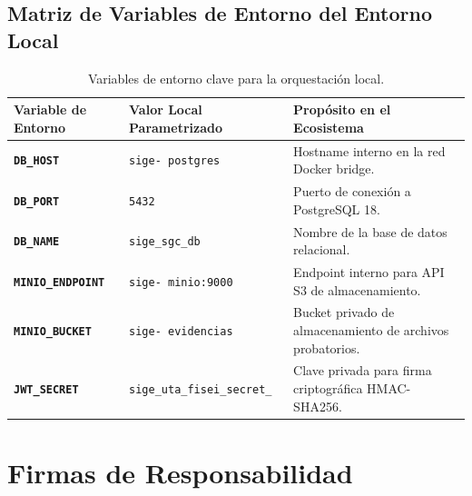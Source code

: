 \documentclass[12pt,a4paper]{article}
\begin{document}
\subsection{Matriz de Variables de Entorno del Entorno Local}
\begin{table}[H]
\centering
\small
\renewcommand{\arraystretch}{1.2}
\begin{tabularx}{\textwidth}{|>{\hsize=0.8\hsize\raggedright\arraybackslash\bfseries\footnotesize}X|>{\hsize=1.0\hsize\raggedright\arraybackslash\footnotesize}X|>{\hsize=1.2\hsize\raggedright\arraybackslash\footnotesize}X|}
\hline
\rowcolor{tableheader}
\textbf{Variable de Entorno} & \textbf{Valor Local Parametrizado} & \textbf{Propósito en el Ecosistema} \\
\hline
\texttt{DB\_\allowbreak  HOST} & \texttt{sige- postgres} & Hostname interno en la red Docker bridge. \\
\hline
\texttt{DB\_\allowbreak  PORT} & \texttt{5432} & Puerto de conexión a PostgreSQL 18. \\
\hline
\texttt{DB\_\allowbreak  NAME} & \texttt{sige\_\allowbreak  sgc\_\allowbreak  db} & Nombre de la base de datos relacional. \\
\hline
\texttt{MINIO\_\allowbreak  ENDPOINT} & \texttt{sige- minio:9000} & Endpoint interno para API S3 de almacenamiento. \\
\hline
\texttt{MINIO\_\allowbreak  BUCKET} & \texttt{sige- evidencias} & Bucket privado de almacenamiento de archivos probatorios. \\
\hline
\texttt{JWT\_\allowbreak  SECRET} & \texttt{sige\_\allowbreak  uta\_\allowbreak  fisei\_\allowbreak  secret\_\allowbreak  2026} & Clave privada para firma criptográfica HMAC-SHA256. \\
\hline
\end{tabularx}
\caption{Variables de entorno clave para la orquestación local.}
\end{table}

\section{Firmas de Responsabilidad}
\end{document}
